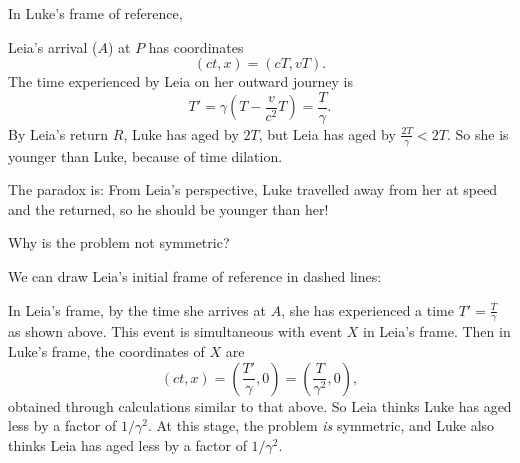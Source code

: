 \documentclass[a4paper]{article}
\begin{document}
In Luke's frame of reference,
\begin{center}
\end{center}
Leia's arrival ($A$) at $P$ has coordinates
\[
  (ct, x) = (cT, vT).
\]
The time experienced by Leia on her outward journey is
\[
  T' = \gamma\left(T - \frac{v}{c^2}T\right) = \frac{T}{\gamma}.
\]
By Leia's return $R$, Luke has aged by $2T$, but Leia has aged by $\frac{2T}{\gamma} < 2T$. So she is younger than Luke, because of time dilation.

The paradox is: From Leia's perspective, Luke travelled away from her at speed and the returned, so he should be younger than her!

Why is the problem not symmetric?

We can draw Leia's initial frame of reference in dashed lines:
\begin{center}
\end{center}
In Leia's frame, by the time she arrives at $A$, she has experienced a time $T' = \frac{T}{\gamma}$ as shown above. This event is simultaneous with event $X$ in Leia's frame. Then in Luke's frame, the coordinates of $X$ are
\[
  (ct, x) = \left(\frac{T'}{\gamma}, 0\right) = \left(\frac{T}{\gamma^2}, 0\right),
\]
obtained through calculations similar to that above. So Leia thinks Luke has aged less by a factor of $1/\gamma^2$. At this stage, the problem \emph{is} symmetric, and Luke also thinks Leia has aged less by a factor of $1/\gamma^2$.
\end{document}
